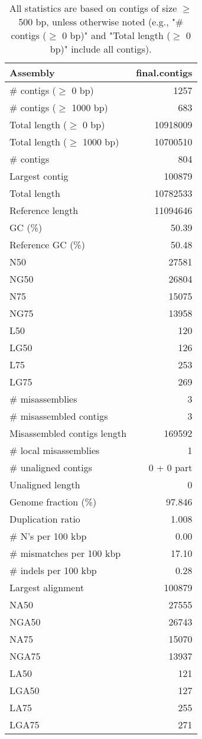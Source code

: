 \documentclass[12pt,a4paper]{article}
\begin{document}
\begin{table}[ht]
\begin{center}
\caption{All statistics are based on contigs of size $\geq$ 500 bp, unless otherwise noted (e.g., "\# contigs ($\geq$ 0 bp)" and "Total length ($\geq$ 0 bp)" include all contigs).}
\begin{tabular}{|l*{1}{|r}|}
\hline
Assembly & final.contigs \\ \hline
\# contigs ($\geq$ 0 bp) & 1257 \\ \hline
\# contigs ($\geq$ 1000 bp) & 683 \\ \hline
Total length ($\geq$ 0 bp) & 10918009 \\ \hline
Total length ($\geq$ 1000 bp) & 10700510 \\ \hline
\# contigs & 804 \\ \hline
Largest contig & 100879 \\ \hline
Total length & 10782533 \\ \hline
Reference length & 11094646 \\ \hline
GC (\%) & 50.39 \\ \hline
Reference GC (\%) & 50.48 \\ \hline
N50 & 27581 \\ \hline
NG50 & 26804 \\ \hline
N75 & 15075 \\ \hline
NG75 & 13958 \\ \hline
L50 & 120 \\ \hline
LG50 & 126 \\ \hline
L75 & 253 \\ \hline
LG75 & 269 \\ \hline
\# misassemblies & 3 \\ \hline
\# misassembled contigs & 3 \\ \hline
Misassembled contigs length & 169592 \\ \hline
\# local misassemblies & 1 \\ \hline
\# unaligned contigs & 0 + 0 part \\ \hline
Unaligned length & 0 \\ \hline
Genome fraction (\%) & 97.846 \\ \hline
Duplication ratio & 1.008 \\ \hline
\# N's per 100 kbp & 0.00 \\ \hline
\# mismatches per 100 kbp & 17.10 \\ \hline
\# indels per 100 kbp & 0.28 \\ \hline
Largest alignment & 100879 \\ \hline
NA50 & 27555 \\ \hline
NGA50 & 26743 \\ \hline
NA75 & 15070 \\ \hline
NGA75 & 13937 \\ \hline
LA50 & 121 \\ \hline
LGA50 & 127 \\ \hline
LA75 & 255 \\ \hline
LGA75 & 271 \\ \hline
\end{tabular}
\end{center}
\end{table}
\end{document}
